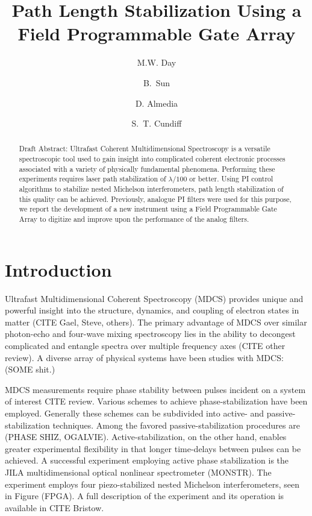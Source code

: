 \documentclass[letterpaper,12pt,amsmath,reprint,aip,jmp,onecolumn]{revtex4-1}
\begin{document}
\title{Path Length Stabilization Using a Field Programmable Gate Array}
\author{M.W. Day}
\author{B.~Sun}%
%

\author{D. Almedia}


\author{S.~T. Cundiff}

\begin{abstract}
Draft Abstract: Ultrafast Coherent Multidimensional Spectroscopy is a versatile spectroscopic tool used to gain insight into complicated coherent electronic processes associated with a variety of physically fundamental phenomena. Performing these experiments requires laser path stabilization of $\lambda / 100$ or better. Using PI control algorithms to stabilize nested Michelson interferometers, path length stabilization of this quality can be achieved. Previously, analogue PI filters were used for this purpose, we report the development of a new instrument using a Field Programmable Gate Array to digitize and improve upon the performance of the analog filters.
\end{abstract}
\maketitle

\section{Introduction}
\indent Ultrafast Multidimensional Coherent Spectroscopy (MDCS) provides unique and powerful insight into the structure, dynamics, and coupling of electron states in matter (CITE Gael, Steve, others). The primary advantage of MDCS over similar photon-echo and four-wave mixing spectroscopy lies in the ability to decongest complicated and entangle spectra over multiple frequency axes (CITE other review).  A diverse array of physical systems have been studies with MDCS: (SOME shit.) 

\indent MDCS measurements require phase stability between pulses incident on a system of interest CITE review. Various schemes to achieve phase-stabilization have been employed. Generally these schemes can be subdivided into active- and passive-stabilization techniques. Among the favored passive-stabilization procedures are (PHASE SHIZ, OGALVIE). Active-stabilization, on the other hand, enables greater experimental flexibility in that longer time-delays between pulses can be achieved. A successful experiment employing active phase stabilization is the JILA multidimensional optical nonlinear spectrometer (MONSTR). The experiment employs four piezo-stabilized nested Michelson interferometers, seen in Figure (FPGA). A full description of the experiment and its operation is available in CITE Bristow.
  
\end{document}
